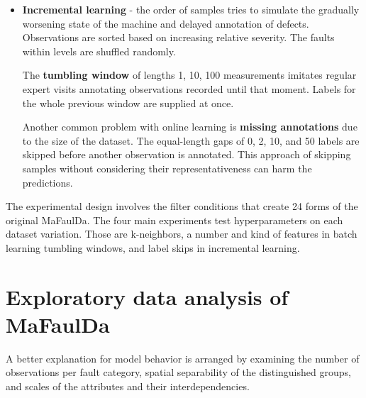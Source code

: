 \begin{itemize}
\item \textbf{Incremental learning} - the order of samples tries to simulate the gradually worsening state of the machine and delayed annotation of defects. Observations are sorted based on increasing relative severity. The faults within levels are shuffled randomly. 

The \textbf{tumbling window} of lengths 1, 10, 100 measurements imitates regular expert visits annotating observations recorded until that moment. Labels for the whole previous window are supplied at once.

Another common problem with online learning is \textbf{missing annotations} due to the size of the dataset. The equal-length gaps of 0, 2, 10, and 50 labels are skipped before another observation is annotated. This approach of skipping samples without considering their representativeness can harm the predictions. 
\end{itemize}

The experimental design involves the filter conditions that create 24 forms of the original MaFaulDa. The four main experiments test hyperparameters on each dataset variation. Those are k-neighbors, a number and kind of features in batch learning tumbling windows, and label skips in incremental learning.

\section{Exploratory data analysis of MaFaulDa}
A better explanation for model behavior is arranged by examining the number of observations per fault category, spatial separability of the distinguished groups, and scales of the attributes and their interdependencies.

